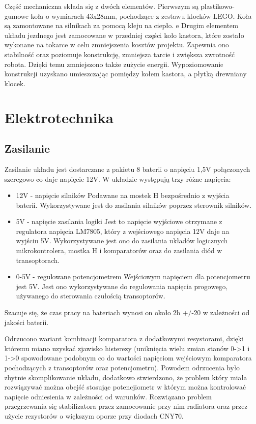 \documentclass[11pt,a4paper]{article}
\begin{document}
  Część mechaniczna składa się z dwóch elementów. Pierwszym są plastikowo-gumowe koła o wymiarach 43x28mm, pochodzące z zestawu klocków LEGO. Koła są zamontowane na silnikach za pomocą kleju na ciepło.
  e
Drugim elementem układu jezdnego jest zamocowane w przedniej części koło kastora, które zostało wykonane na tokarce w celu zmniejszenia kosztów projektu. Zapewnia ono stabilność oraz poziomuje konstrukcję, zmniejsza tarcie i zwiększa zwrotność robota. Dzięki temu zmniejszono także zużycie energii. Wypoziomowanie konstrukcji uzyskano umieszczając pomiędzy kołem kastora, a płytką drewniany klocek.

\section{Elektrotechnika}
\subsection{Zasilanie}
Zasilanie układu jest dostarczane z pakietu 8 baterii o napięciu 1,5V połączonych szeregowo co daje napięcie 12V.
 W układzie występują trzy różne napięcia:
  \begin{itemize} 
  \item 12V - napięcie silników
  Podawane na mostek H bezpośrednio z wyjścia baterii.
  Wykorzystywane jest do zasilania silników poprzez sterownik silników.
  \item 5V - napięcie zasilania logiki
  Jest to napięcie wyjściowe otrzymane z regulatora napięcia LM7805, który z wejściowego napięcia 12V daje na wyjściu 5V.
  Wykorzystywane jest ono do zasilania układów logicznych mikrokontrolera, mostka H i komparatorów oraz do zasilania diód w transoptorach.
  \item 0-5V - regulowane potencjometrem
  Wejściowym napięciem dla potencjometru jest 5V. Jest ono wykorzystywane do regulowania napięcia progowego, używanego do sterowania czułością transoptorów.
  \end{itemize}
  Szacuje się, że czas pracy na bateriach wynosi on około 2h +/-20 w zależności od jakości baterii.

  Odrzucono wariant kombinacji komparatora z dodatkowymi resystorami, dzięki któremu miano uzyskać zjawisko histerezy (uniknięcia wielu zmian stanów 0->1 i 1->0 spowodowane podobnym co do wartości napięciom wejściowym komparatora pochodzących z transoptorów oraz potencjometru).
  Powodem odrzucenia było zbytnie skomplikowanie układu, dodatkowo stwierdzono, że problem który miała rozwiązywać można obejść stosując potencjiometr w którym można kontrolować napięcie odniesienia w zależności od warunków.
  Rozwiązano problem przegrzewania się stabilizatora przez zamocowanie przy nim radiatora oraz przez użycie rezystorów o większym oporze przy diodach CNY70.
\end{document}
